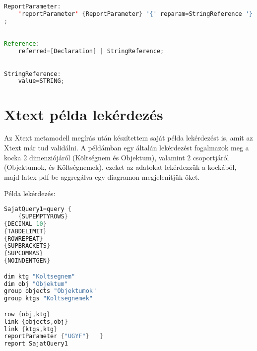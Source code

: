\begin{lstlisting}[language=java,morekeywords={generate,dim,group,row,link,reportParameter,report,query},alsoletter={-},breaklines=true]
	
ReportParameter:
	'reportParameter' {ReportParameter} '{' reparam=StringReference '}'
;
\end{lstlisting}


\begin{lstlisting}[language=java,morekeywords={generate,dim,group,row,link,reportParameter,report,query},alsoletter={-},breaklines=true]

Reference:
	referred=[Declaration] | StringReference;

\end{lstlisting}

\begin{lstlisting}[language=java,morekeywords={generate,dim,group,row,link,reportParameter,report,query},alsoletter={-},breaklines=true]

StringReference:
	value=STRING;
\end{lstlisting}


\section{Xtext példa lekérdezés}

Az Xtext metamodell megírás után készítettem saját példa lekérdezést is, amit az
Xtext már tud validálni. A példámban egy általán lekérdezést fogalmazok meg a
kocka 2 dimenziójáról (Költségnem és Objektum), valamint 2 csoportjáról
(Objektumok, és Költségnemek), ezeket az adatokat lekérdezzük a kockából, majd
latex pdf-be aggregálva egy diagramon megjelenítjük őket.

Példa lekérdezés:
\begin{lstlisting}[language=java,morekeywords={dim,group,row,link,reportParameter,report,query},alsoletter={-},breaklines=true]
SajatQuery1=query {
	{SUPEMPTYROWS}
{DECIMAL 10}
{TABDELIMIT}
{ROWREPEAT}
{SUPBRACKETS}
{SUPCOMMAS}
{NOINDENTGEN}

dim ktg "Koltsegnem"
dim obj "Objektum"
group objects "Objektumok"
group ktgs "Koltsegnemek"

row {obj,ktg}
link {objects,obj}
link {ktgs,ktg}
reportParameter {"UGYF"}   }
report SajatQuery1
\end{lstlisting}